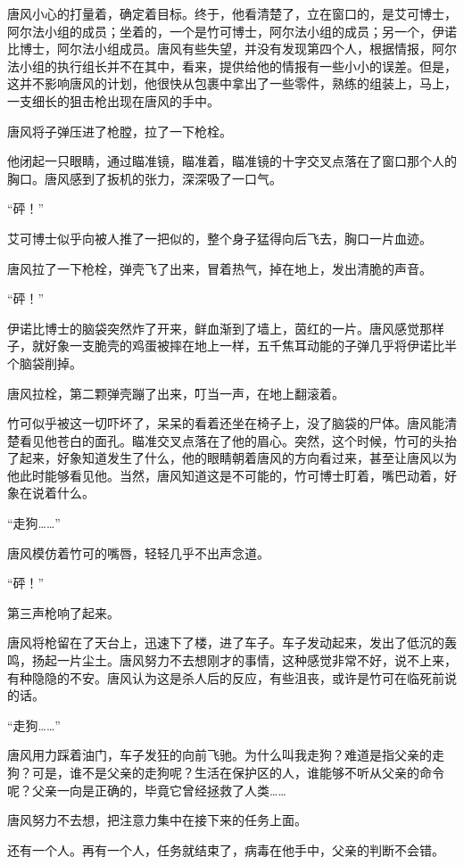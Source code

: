 唐风小心的打量着，确定着目标。终于，他看清楚了，立在窗口的，是艾可博士，阿尔法小组的成员；坐着的，一个是竹可博士，阿尔法小组的成员；另一个，伊诺比博士，阿尔法小组成员。唐风有些失望，并没有发现第四个人，根据情报，阿尔法小组的执行组长并不在其中，看来，提供给他的情报有一些小小的误差。但是，这并不影响唐风的计划，他很快从包裹中拿出了一些零件，熟练的组装上，马上，一支细长的狙击枪出现在唐风的手中。

唐风将子弹压进了枪膛，拉了一下枪栓。

他闭起一只眼睛，通过瞄准镜，瞄准着，瞄准镜的十字交叉点落在了窗口那个人的胸口。唐风感到了扳机的张力，深深吸了一口气。

“砰！”

艾可博士似乎向被人推了一把似的，整个身子猛得向后飞去，胸口一片血迹。

唐风拉了一下枪栓，弹壳飞了出来，冒着热气，掉在地上，发出清脆的声音。

“砰！”

伊诺比博士的脑袋突然炸了开来，鲜血渐到了墙上，茵红的一片。唐风感觉那样子，就好象一支脆壳的鸡蛋被摔在地上一样，五千焦耳动能的子弹几乎将伊诺比半个脑袋削掉。

唐风拉栓，第二颗弹壳蹦了出来，叮当一声，在地上翻滚着。

竹可似乎被这一切吓坏了，呆呆的看着还坐在椅子上，没了脑袋的尸体。唐风能清楚看见他苍白的面孔。瞄准交叉点落在了他的眉心。突然，这个时候，竹可的头抬了起来，好象知道发生了什么，他的眼睛朝着唐风的方向看过来，甚至让唐风以为他此时能够看见他。当然，唐风知道这是不可能的，竹可博士盯着，嘴巴动着，好象在说着什么。

“走狗……”

唐风模仿着竹可的嘴唇，轻轻几乎不出声念道。

“砰！”

第三声枪响了起来。

唐风将枪留在了天台上，迅速下了楼，进了车子。车子发动起来，发出了低沉的轰鸣，扬起一片尘土。唐风努力不去想刚才的事情，这种感觉非常不好，说不上来，有种隐隐的不安。唐风认为这是杀人后的反应，有些沮丧，或许是竹可在临死前说的话。

“走狗……”

唐风用力踩着油门，车子发狂的向前飞驰。为什么叫我走狗？难道是指父亲的走狗？可是，谁不是父亲的走狗呢？生活在保护区的人，谁能够不听从父亲的命令呢？父亲一向是正确的，毕竟它曾经拯救了人类……

唐风努力不去想，把注意力集中在接下来的任务上面。

还有一个人。再有一个人，任务就结束了，病毒在他手中，父亲的判断不会错。

